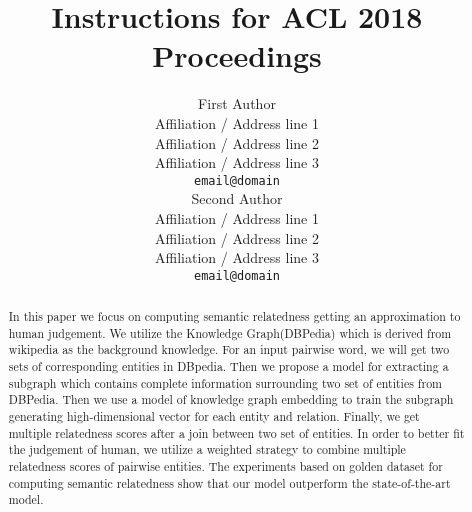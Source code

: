 \documentclass[11pt,a4paper]{article}
\title{Instructions for ACL 2018 Proceedings}
\author{First Author \\
  Affiliation / Address line 1 \\
  Affiliation / Address line 2 \\
  Affiliation / Address line 3 \\
  {\tt email@domain} \\\And
  Second Author \\
  Affiliation / Address line 1 \\
  Affiliation / Address line 2 \\
  Affiliation / Address line 3 \\
  {\tt email@domain} \\}
\date{}
\begin{document}
\maketitle
\begin{abstract}
  In this paper we focus on computing semantic relatedness getting an approximation to human judgement.
  We utilize the Knowledge Graph(DBPedia) which is derived from wikipedia as the background knowledge.
  For an input pairwise word, we will get two sets of corresponding entities in DBpedia.
  Then we propose a model for extracting a subgraph which contains complete information surrounding two set of entities from DBPedia.
  Then we use a model of knowledge graph embedding to train the subgraph generating high-dimensional vector for each entity and relation. 
  Finally, we get multiple relatedness scores after a join between two set of entities.
  In order to better fit the judgement of human, we utilize a weighted strategy to combine
  multiple relatedness scores of pairwise entities.
  The experiments based on golden dataset for computing semantic relatedness show
  that our model outperform the state-of-the-art model.
\end{abstract}









\end{document}
